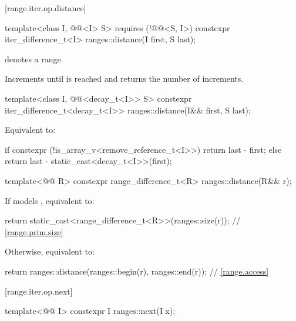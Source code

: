 [range.iter.op.distance]{}
%
\begin{itemdecl}
template<class I, @@<I> S>
  requires (!@@<S, I>)
  constexpr iter_difference_t<I> ranges::distance(I first, S last);
\end{itemdecl}

\begin{itemdescr}
\pnum
\expects
{} denotes a range.

\pnum
\effects
Increments  until  is reached and
returns the number of increments.
\end{itemdescr}

%
\begin{itemdecl}
template<class I, @@<decay_t<I>> S>
  constexpr iter_difference_t<decay_t<I>> ranges::distance(I&& first, S last);
\end{itemdecl}

\begin{itemdescr}
\pnum
\effects
Equivalent to:
\begin{codeblock}
if constexpr (!is_array_v<remove_reference_t<I>>)
  return last - first;
else
  return last - static_cast<decay_t<I>>(first);
\end{codeblock}
\end{itemdescr}

%
\begin{itemdecl}
template<@@ R>
  constexpr range_difference_t<R> ranges::distance(R&& r);
\end{itemdecl}

\begin{itemdescr}
\pnum
\effects
If  models , equivalent to:
\begin{codeblock}
return static_cast<range_difference_t<R>>(ranges::size(r));     // \ref{range.prim.size}
\end{codeblock}
Otherwise, equivalent to:
\begin{codeblock}
return ranges::distance(ranges::begin(r), ranges::end(r));      // \ref{range.access}
\end{codeblock}
\end{itemdescr}

[range.iter.op.next]{}

%
\begin{itemdecl}
template<@@ I>
  constexpr I ranges::next(I x);
\end{itemdecl}


